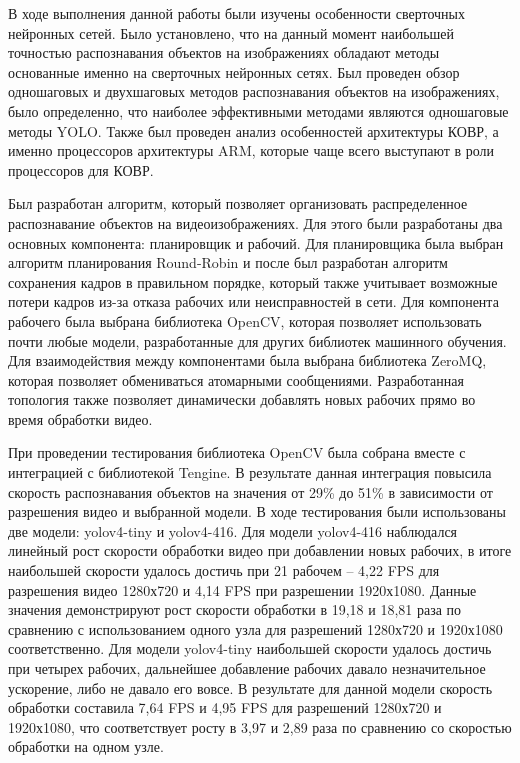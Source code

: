 
В ходе выполнения данной работы были изучены особенности сверточных нейронных сетей. Было установлено, что на данный
момент наибольшей точностью распознавания объектов на изображениях обладают методы основанные именно на сверточных
нейронных сетях. Был проведен обзор одношаговых и двухшаговых методов распознавания объектов на изображениях, было 
определенно, что наиболее эффективными методами являются одношаговые методы YOLO. Также был проведен анализ особенностей 
архитектуры КОВР, а именно процессоров архитектуры ARM, которые чаще всего выступают в роли процессоров для КОВР.

Был разработан алгоритм, который позволяет организовать распределенное распознавание объектов на видеоизображениях. Для 
этого были разработаны два основных компонента: планировщик и рабочий. Для планировщика была выбран алгоритм планирования
Round-Robin и после был разработан алгоритм сохранения кадров в правильном порядке, который также учитывает возможные 
потери кадров из-за отказа рабочих или неисправностей в сети. Для компонента рабочего была выбрана библиотека OpenCV,
которая позволяет использовать почти любые модели, разработанные для других библиотек машинного обучения. Для взаимодействия
между компонентами была выбрана библиотека ZeroMQ, которая позволяет обмениваться атомарными сообщениями. Разработанная 
топология также позволяет динамически добавлять новых рабочих прямо во время обработки видео.

При проведении тестирования библиотека OpenCV была собрана вместе с интеграцией с библиотекой Tengine. В результате данная 
интеграция повысила скорость распознавания объектов на значения от 29\% до 51\% в зависимости от разрешения видео и 
выбранной модели. В ходе тестирования были использованы две модели: yolov4-tiny и yolov4-416. Для модели yolov4-416 
наблюдался линейный рост скорости обработки видео при добавлении новых рабочих, в итоге наибольшей скорости удалось 
достичь при 21 рабочем -- 4,22 FPS для разрешения видео 1280х720 и 4,14 FPS при разрешении 1920х1080. Данные значения
демонстрируют рост скорости обработки в 19,18 и 18,81 раза по сравнению с использованием одного узла для разрешений
1280х720 и 1920х1080 соответственно. Для модели yolov4-tiny наибольшей скорости удалось достичь при четырех рабочих, 
дальнейшее добавление рабочих давало незначительное ускорение, либо не давало его вовсе. В результате для данной модели
скорость обработки составила 7,64 FPS и 4,95 FPS для разрешений 1280х720 и 1920х1080, что соответствует росту в 3,97 и 
2,89 раза по сравнению со скоростью обработки на одном узле.

